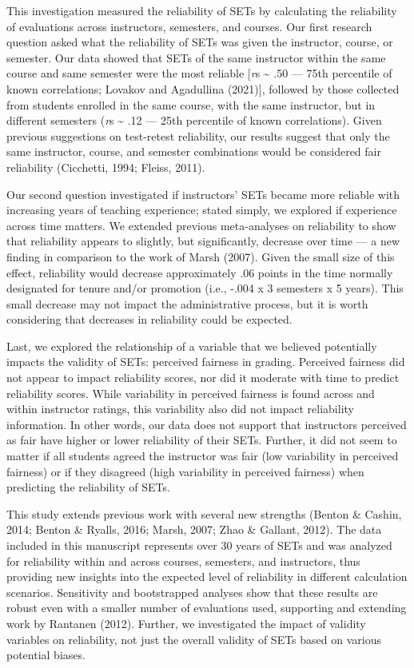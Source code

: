 \documentclass[
  man,mask]{apa7}
\begin{document}
This investigation measured the reliability of SETs by calculating the reliability of evaluations across instructors, semesters, and courses. Our first research question asked what the reliability of SETs was given the instructor, course, or semester. Our data showed that SETs of the same instructor within the same course and same semester were the most reliable {[}\emph{r}s \textasciitilde{} .50 --- 75th percentile of known correlations; Lovakov and Agadullina (2021){]}, followed by those collected from students enrolled in the same course, with the same instructor, but in different semesters (\emph{r}s \textasciitilde{} .12 --- 25th percentile of known correlations). Given previous suggestions on test-retest reliability, our results suggest that only the same instructor, course, and semester combinations would be considered fair reliability (Cicchetti, 1994; Fleiss, 2011).

Our second question investigated if instructors' SETs
became more reliable with increasing years of teaching experience;
stated simply, we explored if experience across time matters. We
extended previous meta-analyses on reliability to show that reliability
appears to slightly, but significantly, decrease over time --- a new
finding in comparison to the work of Marsh (2007). Given the small size of
this effect, reliability would decrease approximately .06 points in the
time normally designated for tenure and/or promotion (i.e., -.004 x 3
semesters x 5 years). This small decrease may not impact the
administrative process, but it is worth considering that decreases in
reliability could be expected.

Last, we explored the relationship of a variable that we believed
potentially impacts the validity of SETs: perceived fairness in grading.
Perceived fairness did not appear to impact reliability scores, nor did
it moderate with time to predict reliability scores. While variability
in perceived fairness is found across and within instructor ratings,
this variability also did not impact reliability information. In other
words, our data does not support that instructors perceived as fair have
higher or lower reliability of their SETs. Further, it did not seem to
matter if all students agreed the instructor was fair (low variability
in perceived fairness) or if they disagreed (high variability in
perceived fairness) when predicting the reliability of SETs.

This study extends previous work with several new strengths (Benton \& Cashin, 2014; Benton \& Ryalls, 2016; Marsh, 2007; Zhao \& Gallant, 2012). The data included in this
manuscript represents over 30 years of SETs and was analyzed for
reliability within and across courses, semesters, and instructors, thus providing new insights into the expected level of reliability in
different calculation scenarios. Sensitivity and bootstrapped analyses
show that these results are robust even with a smaller number of
evaluations used, supporting and extending work by Rantanen (2012).
Further, we investigated the impact of validity variables on
reliability, not just the overall validity of SETs based on various
potential biases.
\end{document}
